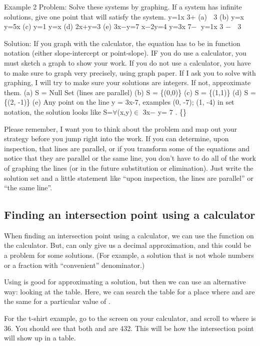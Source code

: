 Example 2
Problem: Solve these systems by graphing. If a system has infinite solutions, give one point that will satisfy the system.
 y=1x 3+ (a)  3
(b) y=x y=5x
(c) y=1 y=x
(d) 2x+y=3 (e) 3x−y=7 x−2y=4 y=3x 7−
 y=1x 3 −  3

Solution:
 If you graph with the calculator, the equation has to be in function notation (either slope-intercept or point-slope). IF you do use a calculator, you must sketch a graph to show your work. If you do not use a calculator, you have to make sure to graph very precisely, using graph paper. If I ask you to solve with graphing, I will try to make sure your solutions are integers. If not, approximate them.
(a) S = Null Set (lines are parallel) (b) S = \{(0,0)\}
(c) S = \{(1,1)\}
(d) S = \{(2, -1)\}
(e) Any point on the line y = 3x-7, examples (0, -7); (1, -4) in set notation, the solution looks like
S=$\forall$(x,y)$\in$ 3x− y= 7 . \{\}

Please remember, I want you to think about the problem and map out your strategy before you jump right into the work. If you can determine, upon inspection, that lines are parallel, or if you transform some of the equations and notice that they are parallel or the same line, you don't have to do all of the work of graphing the lines (or in the future substitution or elimination). Just write the solution set and a little statement like ``upon inspection, the lines are parallel'' or ``the same line''.


\subsection{Finding an intersection point using a calculator}

When finding an intersection point using a calculator, we can use the  function on the calculator. But,  can only give us a decimal approximation, and this could be a problem for some solutions. (For example, a solution that is not whole numbers or a fraction with ``convenient'' denominator.)

Using  is good for approximating a solution, but then we can use an alternative way: looking at the table. Here, we can search the table for a place where  and  are the same for a particular value of .

For the t-shirt example, go to the  screen on your calculator, and scroll to where  is 36. You should see that both  and  are 432. This will be how the intersection point will show up in a table.


